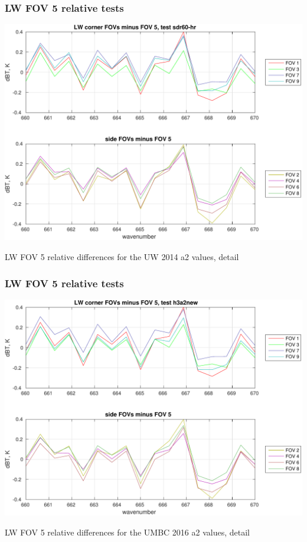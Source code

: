 \documentclass[11pt]{beamer}
\begin{document}
\begin{frame}
\frametitle{LW FOV 5 relative tests}
\begin{center}
  \includegraphics[scale=0.5]{figures/LW_rel_zoom1_sdr60.pdf}
\end{center}
\begin{center}
  LW FOV 5 relative differences for the UW 2014 a2 values, detail
\end{center}
\end{frame}
\begin{frame}
\frametitle{LW FOV 5 relative tests}
\begin{center}
  \includegraphics[scale=0.5]{figures/LW_rel_zoom1_a2new.pdf}
\end{center}
\begin{center}
  LW FOV 5 relative differences for the UMBC 2016 a2 values, detail
\end{center}
\end{frame}
\end{document}
